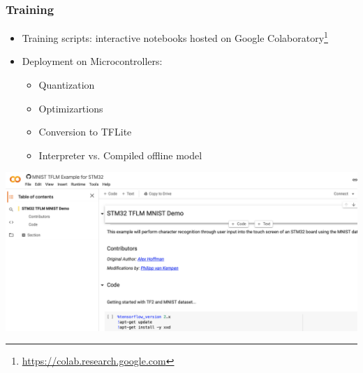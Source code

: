 \documentclass{tum-presentation}
\begin{document}
\begin{frame}
  \frametitle{Training}
  
  \begin{itemize}
      \item Training scripts: interactive notebooks hosted on Google Colaboratory\footnote{\url{https://colab.research.google.com}}
      \item Deployment on Microcontrollers:
      \begin{itemize}
          \item Quantization
          \item Optimizartions
          \item Conversion to TFLite
          \item Interpreter vs. Compiled offline model
      \end{itemize}
  \end{itemize}
  \vspace{-5em}
  \hspace{20em}\includegraphics[width=.7\textwidth]{figures/screen_colab.png}
\end{frame}
\end{document}
